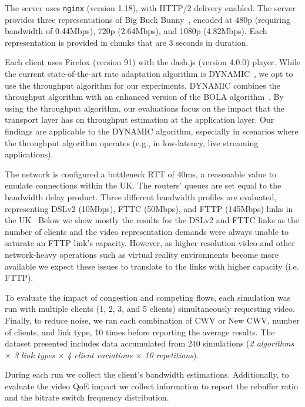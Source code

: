 \documentclass[10pt,sigconf,anonymous]{acmart}
\begin{document}
The server uses \texttt{nginx} (version 1.18), with HTTP/2 delivery enabled. The server provides three representations of Big Buck Bunny~\cite{online-bbb}, encoded at 480p (requiring bandwidth of 0.44Mbps), 720p (2.64Mbps), and 1080p (4.82Mbps). Each representation is provided in chunks that are 3 seconds in duration.

Each client uses Firefox (version 91) with the dash.js (version 4.0.0) player. While the current state-of-the-art rate adaptation algorithm is DYNAMIC~\cite{Spiteri-2019-from-theory-to-practice-sabre}, we opt to use the throughput algorithm for our experiments. DYNAMIC combines the throughput algorithm with an enhanced version of the BOLA algorithm~\cite{Spiteri-2016-BOLA}. By using the throughput algorithm, our evaluations focus on the impact that the transport layer has on throughput estimation at the application layer. Our findings are applicable to the DYNAMIC algorithm, especially in scenarios where the throughput algorithm operates (e.g., in low-latency, live streaming applications).

The network is configured a bottleneck RTT of 40ms, a reasonable value to emulate connections within the UK. The routers' queues are set equal to the bandwidth delay product. Three different bandwidth profiles are evaluated, representing DSLv2 (10Mbps), FTTC (50Mbps), and FTTP (145Mbps) links in the UK~\cite{online-ofcom-report} Below we show mostly the results for the DSLv2 and FTTC links as the number of clients and the video representation demands were always unable to saturate an FTTP link's capacity. However, as higher resolution video and other network-heavy operations such as virtual reality environments become more available we expect these issues to translate to the links with higher capacity (i.e. FTTP).

To evaluate the impact of congestion and competing flows, each simulation was run with multiple clients (1, 2, 3, and 5 clients) simultaneously requesting video. Finally, to reduce noise, we ran each combination of CWV or New CWV, number of clients, and link type, 10 times before reporting the average results. The dataset presented includes data accumulated from 240 simulations (\emph{2 algorithms $\times$ 3 link types $\times$ 4 client variations $\times$ 10 repetitions}). 

During each run we collect the client's bandwidth estimations. Additionally, to evaluate the video QoE impact we collect information to report the rebuffer ratio and the bitrate switch frequency distribution.
\end{document}

